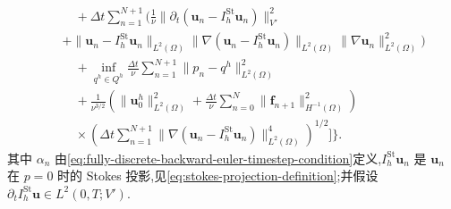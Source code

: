 \begin{theorem}
\begin{equation}
\begin{aligned}
  &\qquad+\Delta t\sum_{n=1}^{N+1}\Biggl(
        \frac1\nu\|\partial_t(\bm{u}_n-I_h^{\mathrm{St}}\bm{u}_n)\|_{V'}^2\\
  &\quad+\|\bm{u}_n-I_h^{\mathrm{St}}\bm{u}_n\|_{L^2(\Omega)}
         \|\nabla(\bm{u}_n-I_h^{\mathrm{St}}\bm{u}_n)\|_{L^2(\Omega)}
         \|\nabla\bm{u}_n\|_{L^2(\Omega)}^2\Biggr)\\
 &\qquad+\inf_{q^h\in Q^h}\frac{\Delta t}{\nu}
       \sum_{n=1}^{N+1}\|p_n-q^h\|_{L^2(\Omega)}^2\\
 &\qquad+\frac1{\nu^{3/2}}
       \left(\|\bm{u}_0^h\|_{L^2(\Omega)}^2
          +\frac{\Delta t}{\nu}\sum_{n=0}^{N}
             \|\bm{f}_{n+1}\|_{H^{-1}(\Omega)}^2\right)\\
  &\qquad\times
       \left(\Delta t\sum_{n=1}^{N+1}
          \|\nabla(\bm{u}_n-I_h^{\mathrm{St}}\bm{u}_n)\|_{L^2(\Omega)}^4
       \right)^{1/2}\Biggr]\Biggr\}.
\end{aligned}
\end{equation}
其中 $\alpha_n$ 由\cref{eq:fully-discrete-backward-euler-timestep-condition}定义,$I_h^{\mathrm{St}}\bm{u}_n$ 是 $\bm{u}_n$ 在 $p=0$ 时的 Stokes 投影,见\cref{eq:stokes-projection-definition};并假设
$\partial_t I_h^{\mathrm{St}}\bm{u}\in L^2(0,T;V')$.
\end{theorem}

